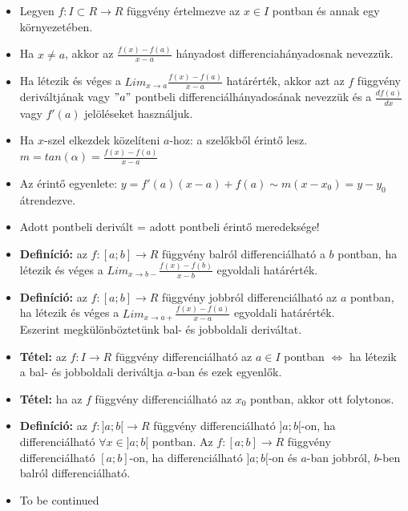 \documentclass[12pt,a4paper]{article}
\begin{document}
\begin{tcolorbox}[colback=green!5!white,colframe=green!60!black,title= 5. Derivált]
    \begin{itemize}
    \item  Legyen \(f:I \subset R \to R\) függvény értelmezve az \(x \in I\) pontban és annak egy környezetében. 
    \item Ha \(x \neq  a\), akkor az \(\frac{f(x)-f(a)}{x-a}\) hányadost differenciahányadosnak nevezzük.
    \item Ha létezik és véges a \(Lim_{x\to a}\frac{f(x)-f(a)}{x-a}\) határérték, akkor azt az \(f\) függvény deriváltjának vagy \("a"\) pontbeli differenciálhányadosának nevezzük és a \(\frac{d f(a)}{d x}\) vagy \(f'(a)\) jelöléseket használjuk.
    \item Ha \(x\)-szel elkezdek közelíteni \(a\)-hoz: a szelőkből érintő lesz. \(m = tan(\alpha) =\frac{f(x)-f(a)}{x-a}\)
    \item Az érintő egyenlete: \(y = f'(a)(x - a) + f(a) \sim  m(x - x_0) = y - y_0\) átrendezve.
    \item Adott pontbeli derivált = adott pontbeli érintő meredeksége!
    \item \textbf{Definíció:} az \(f:[a; b] \to R\) függvény balról differenciálható a \(b\) pontban, ha létezik és véges a \(Lim_{x \to b-}\frac{f(x)-f(b)}{x-b}\) egyoldali határérték.
    \item \textbf{Definíció:} az \(f:[a; b] \to R\) függvény jobbról differenciálható az \(a\) pontban, ha létezik és véges a \(Lim_{x \to a+}\frac{f(x)-f(a)}{x-a}\) egyoldali határérték.
    \\Eszerint megkülönböztetünk bal- és jobboldali deriváltat.
    \item \textbf{Tétel:} az \(f:I \to R\) függvény differenciálható az \(a \in I\) pontban \(\Longleftrightarrow\)  ha létezik a bal- és jobboldali deriváltja \(a\)-ban és ezek egyenlők.
    \item \textbf{Tétel:} ha az \(f\) függvény differenciálható az \(x_0\) pontban, akkor ott folytonos.
    \item \textbf{Definíció:} az \(f: ]a; b[ \to R\) függvény differenciálható \(]a;b[\)-on, ha differenciálható \(\forall x \in]a; b[\) pontban.
        Az \(f:[a; b] \to R\) függvény differenciálható \([a;b]\)-on, ha differenciálható \(]a; b[ \)-on és \(a\)-ban jobbról, \(b\)-ben balról differenciálható.
\end{itemize}

\end{tcolorbox}

\begin{tcolorbox}[colback=green!5!white,colframe=green!60!black,title= 6. Lokális szélsőérték definíciója és feltétele]
    \begin{itemize}
        \item To be continued
    \end{itemize}
\end{tcolorbox}
\end{document}
